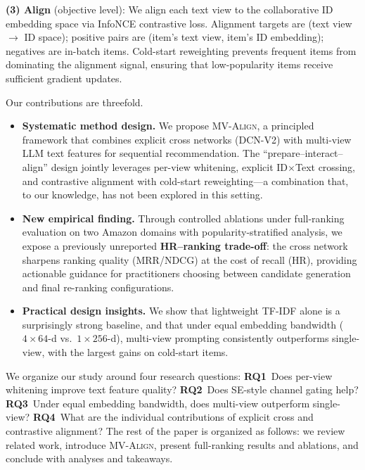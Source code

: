 \documentclass[sigconf,natbib=true,anonymous]{acmart}
\newcommand{\model}{\textsc{MV-Align}\xspace}
\newcommand{\tfidf}{\textsc{TF-IDF}\xspace}
\newcommand{\llm}{\textsc{LLM}\xspace}
\begin{document}
\textbf{(3) Align} (objective level): We align each text view
to the collaborative ID embedding space via InfoNCE contrastive
loss. Alignment targets are (text view $\to$ ID space); positive
pairs are (item's text view, item's ID embedding); negatives are
in-batch items. \mbox{Cold-start} reweighting prevents frequent items
from dominating the align\-ment signal, ensuring that
low-popularity items receive sufficient gradient updates.

Our contributions are threefold.
\begin{itemize}[leftmargin=*,itemsep=1pt]
  \item \textbf{Systematic method design.} We propose \model, a
    principled framework that combines explicit cross networks (DCN-V2)
    with multi-view \llm text features for sequential recommendation.
    The ``prepare--interact--align'' design jointly leverages per-view
    whitening, explicit ID$\times$Text crossing, and contrastive
    alignment with cold-start reweighting---a combination that, to our
    knowledge, has not been explored in this setting.
  \item \textbf{New empirical finding.} Through controlled ablations
    under full-ranking evaluation on two Amazon domains with
    popularity-stratified analysis, we expose a previously unreported
    \textbf{HR--ranking trade-off}: the cross network sharpens ranking
    quality (MRR/NDCG) at the cost of recall (HR), providing
    actionable guidance for practitioners choosing between candidate
    generation and final re-ranking configurations.
  \item \textbf{Practical design insights.} We show that lightweight
    \tfidf alone is a surprisingly strong baseline, and that under
    equal embedding bandwidth ($4{\times}64$-d vs.\ $1{\times}256$-d),
    multi-view prompting consistently outperforms single-view,
    with the largest gains on cold-start items.
\end{itemize}
We organize our study around four research questions:
\textbf{RQ1}~Does per-view whitening improve text feature quality?
\textbf{RQ2}~Does SE-style channel gating help?
\textbf{RQ3}~Under equal embedding bandwidth, does multi-view outperform single-view?
\textbf{RQ4}~What are the individual contributions of explicit cross and contrastive alignment?
The rest of the paper is organized as follows: we review
related work, introduce \model, present full-ranking results
and ablations, and conclude with analyses and takeaways.

\end{document}

